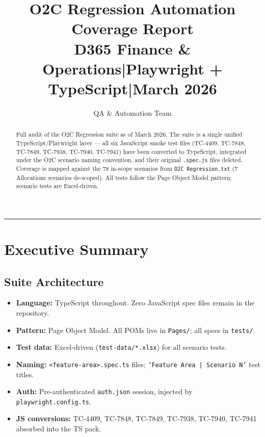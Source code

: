 \documentclass[a4paper,11pt]{article}
\title{%
  \vspace{-1cm}%
  {\LARGE\bfseries O2C Regression Automation}\\[0.4em]
  {\Large\bfseries Coverage Report}\\[0.6em]
  {\normalsize D365 Finance \& Operations\quad|\quad Playwright + TypeScript\quad|\quad March 2026}%
}
\author{QA \& Automation Team}
\date{}
\begin{document}
\maketitle
\vspace{-0.5cm}
\noindent\rule{\linewidth}{0.8pt}
\vspace{0.3cm}

\begin{abstract}
\noindent
Full audit of the O2C Regression suite as of March 2026. The suite is a single unified TypeScript/Playwright layer — all six JavaScript smoke test files (TC-4409, TC-7848, TC-7849, TC-7938, TC-7940, TC-7941) have been converted to TypeScript, integrated under the O2C scenario naming convention, and their original \texttt{.spec.js} files deleted. Coverage is mapped against the 78 in-scope scenarios from \texttt{O2C Regression.txt} (7 Allocations scenarios de-scoped). All tests follow the Page Object Model pattern; scenario tests are Excel-driven.
\end{abstract}

\tableofcontents
\newpage

\section{Executive Summary}

\subsection{Suite Architecture}

\begin{tcolorbox}[colback=lightTeal,colframe=statusTeal!70!black,title=\textbf{Single Unified TypeScript Suite}]
\begin{itemize}[leftmargin=1.5em,itemsep=3pt]
    \item \textbf{Language:} TypeScript throughout. Zero JavaScript spec files remain in the repository.
    \item \textbf{Pattern:} Page Object Model. All POMs live in \texttt{Pages/}; all specs in \texttt{tests/}.
    \item \textbf{Test data:} Excel-driven (\texttt{test-data/*.xlsx}) for all scenario tests.
    \item \textbf{Naming:} \texttt{<feature-area>.spec.ts} files; \texttt{`Feature Area | Scenario N'} test titles.
    \item \textbf{Auth:} Pre-authenticated \texttt{auth.json} session, injected by \texttt{playwright.config.ts}.
    \item \textbf{JS conversions:} TC-4409, TC-7848, TC-7849, TC-7938, TC-7940, TC-7941 absorbed into the TS pack.
\end{itemize}
\end{tcolorbox}
\end{document}
